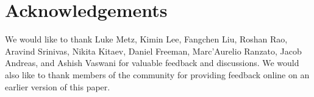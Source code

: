 \documentclass{article} %
\begin{document}
\section*{Acknowledgements}

We would like to thank Luke Metz, Kimin Lee, Fangchen Liu, Roshan Rao, Aravind Srinivas, Nikita Kitaev, Daniel Freeman, Marc'Aurelio Ranzato, Jacob Andreas, and Ashish Vaswani for valuable feedback and discussions.
We would also like to thank members of the community for providing feedback online on an earlier version of this paper.

\clearpage



\clearpage



\clearpage

\appendix


\end{document}
